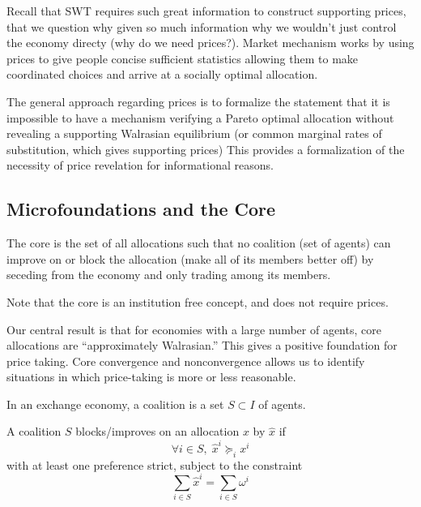 

Recall that SWT requires such great information to construct
supporting prices, that we question why given so much information why
we wouldn't just control the economy directy (why do we need prices?).
Market mechanism works by using prices to give people concise
sufficient statistics allowing them to make coordinated choices and
arrive at a socially optimal allocation.

The general approach regarding prices is to formalize the statement
that it is impossible to have a mechanism verifying a Pareto optimal
allocation without revealing a supporting Walrasian equilibrium (or
common marginal rates of substitution, which gives supporting prices)
This provides a formalization of the necessity of price revelation for
informational reasons.


\subsection{Microfoundations and the Core}
\label{sec:micr-core}

\begin{definition}[Core]
  The core is the set of all allocations such that no coalition (set
  of agents) can improve on or block the allocation (make all of its
  members better off) by seceding from the economy and only trading
  among its members.
\end{definition}

Note that the core is an institution free concept, and does not
require prices.

Our central result is that for economies with a large number of
agents, core allocations are ``approximately Walrasian.'' This gives a
positive foundation for price taking. Core convergence and
nonconvergence allows us to identify situations in which price-taking
is more or less reasonable.


\begin{definition}[Coalition]
  In an exchange economy, a coalition is a set $S \subset I$ of agents.
\end{definition}

\begin{definition}
  A coalition $S$ blocks/improves on an allocation $x$ by $\hat x$ if 
  \[
  \forall i \in S, \; \hat x^i \succeq_i x^i
  \]
  with at least one preference strict, subject to the constraint
  \[
  \sum_{i \in S} \hat x^i = \sum_{i \in S} \omega^i
  \]
\end{definition}

